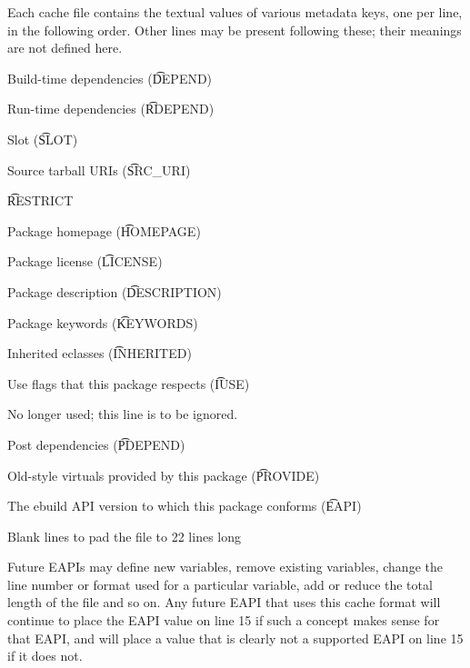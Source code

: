 Each cache file contains the textual values of various metadata keys, one per line, in the following
order. Other lines may be present following these; their meanings are not defined here.

\begin{compactenum}
\item Build-time dependencies (\t{DEPEND})
\item Run-time dependencies (\t{RDEPEND})
\item Slot (\t{SLOT})
\item Source tarball URIs (\t{SRC\_URI})
\item \t{RESTRICT}
\item Package homepage (\t{HOMEPAGE})
\item Package license (\t{LICENSE})
\item Package description (\t{DESCRIPTION})
\item Package keywords (\t{KEYWORDS})
\item Inherited eclasses (\t{INHERITED})
\item Use flags that this package respects (\t{IUSE})
\item No longer used; this line is to be ignored.
\item Post dependencies (\t{PDEPEND})
\item Old-style virtuals provided by this package (\t{PROVIDE})
\item The ebuild API version to which this package conforms (\t{EAPI})
\item Blank lines to pad the file to 22 lines long
\end{compactenum}

Future EAPIs may define new variables, remove existing variables, change the line number or
format used for a particular variable, add or reduce the total length of the file and so on.
Any future EAPI that uses this cache format will continue to place the EAPI value on
line 15 if such a concept makes sense for that EAPI, and will place a value that is clearly
not a supported EAPI on line 15 if it does not.


